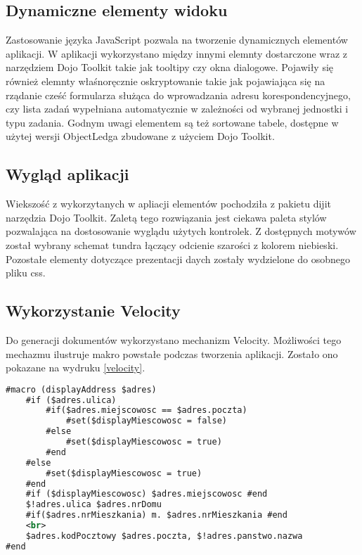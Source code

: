 \subsection[Dynamiczne elementy widoku][Dynamiczne elementy widoku]{Dynamiczne elementy widoku}
Zastosowanie języka JavaScript pozwala na tworzenie dynamicznych elementów aplikacji. W aplikacji wykorzystano między innymi elemnty dostarczone wraz z narzędziem Dojo Toolkit takie jak tooltipy czy okna dialogowe. Pojawiły się również elemnty właśnoręcznie oskryptowanie takie jak pojawiająca się na rządanie cześć formularza służąca do wprowadzania adresu korespondencyjnego, czy lista zadań wypełniana automatycznie w zależności od wybranej jednostki i typu zadania. Godnym uwagi elementem są też sortowane tabele, dostępne w użytej wersji ObjectLedga zbudowane z użyciem Dojo Toolkit.

\subsection[Wygląd aplikacji][Wygląd aplikacji]{Wygląd aplikacji}
Wiekszość z wykorzytanych w apliacji elementów pochodziła z pakietu dijit narzędzia Dojo Toolkit. Zaletą tego rozwiązania jest ciekawa paleta stylów pozwalająca na dostosowanie wyglądu użytych kontrolek. Z dostępnych motywów został wybrany schemat tundra łączący odcienie szarości z kolorem niebieski. Pozostałe elementy dotyczące prezentacji daych zostały wydzielone do osobnego pliku css.

\subsection[Wykorzystanie Velocity][Wykorzystanie Velocity]{Wykorzystanie Velocity}
Do generacji dokumentów wykorzystano mechanizm Velocity. Możliwości tego mechazmu ilustruje makro powstałe podczas tworzenia aplikacji. Zostało ono pokazane na wydruku \ref{velocity}.

\begin{lstlisting}[language=XML,style=outcode,showstringspaces=false,caption=Definicja makra w Velocity,label={velocity}]
#macro (displayAddress $adres) 
	#if ($adres.ulica)
		#if($adres.miejscowosc == $adres.poczta)
			#set($displayMiescowosc = false)
		#else
			#set($displayMiescowosc = true)
		#end
	#else
		#set($displayMiescowosc = true)
	#end
	#if ($displayMiescowosc) $adres.miejscowosc #end
	$!adres.ulica $adres.nrDomu 
	#if($adres.nrMieszkania) m. $adres.nrMieszkania #end
	<br>
	$adres.kodPocztowy $adres.poczta, $!adres.panstwo.nazwa
#end
\end{lstlisting}

